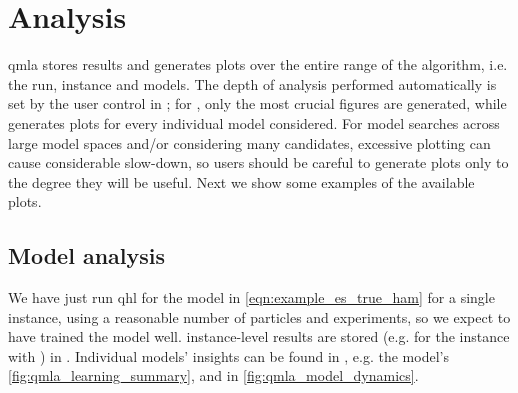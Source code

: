 \section{Analysis}
\gls{qmla} stores results and generates plots
    over the entire range of the algorithm\footnotemark, i.e. the \gls{run}, \gls{instance} and models. 
The depth of analysis performed automatically is set by the user control  in ;
    for , only the most crucial figures are generated, while  generates plots for every individual 
    model considered. 
For model searches across large model spaces and/or considering many candidates,
    excessive plotting can cause considerable slow-down, so users should be careful to generate plots only 
    to the degree they will be useful. 
Next we show some examples of the available plots. 
\par 

\subsection{Model analysis}

We have just run \acrfull{qhl} for the model in \cref{eqn:example_es_true_ham} for a single instance, 
    using a reasonable number of particles and experiments, so we expect to have trained the model well. 
\Gls{instance}-level results are stored (e.g. for the instance with ) in .
Individual models' insights can be found in , 
    e.g. the model's  \cref{fig:qmla_learning_summary}, and  in \cref{fig:qmla_model_dynamics}.
\par 

